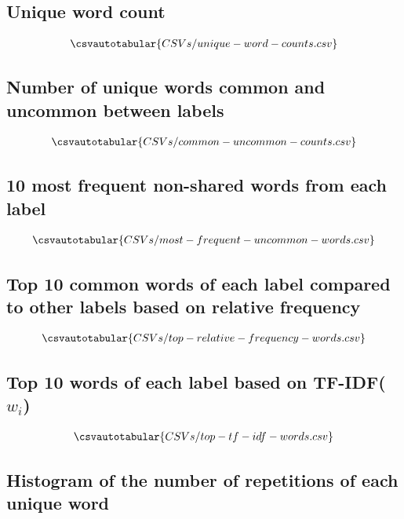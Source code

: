 \documentclass[12pt]{article}
\begin{document}
\subsection{Unique word count}
\begin{align*}
    \csvautotabular{CSVs/unique-word-counts.csv}
\end{align*}

\subsection{Number of unique words common and uncommon between labels}
\begin{align*}
    \csvautotabular{CSVs/common-uncommon-counts.csv}
\end{align*}

\subsection{10 most frequent non-shared words from each label}
\begin{align*}
    \csvautotabular{CSVs/most-frequent-uncommon-words.csv}
\end{align*}

\subsection{Top 10 common words of each label compared to other labels based on relative frequency}
\begin{align*}
    \csvautotabular{CSVs/top-relative-frequency-words.csv}
\end{align*}

\subsection{Top 10 words of each label based on TF-IDF($w_i$)}
\begin{align*}
    \csvautotabular{CSVs/top-tf-idf-words.csv}
\end{align*}

\subsection{Histogram of the number of repetitions of each unique word}
\end{document}
